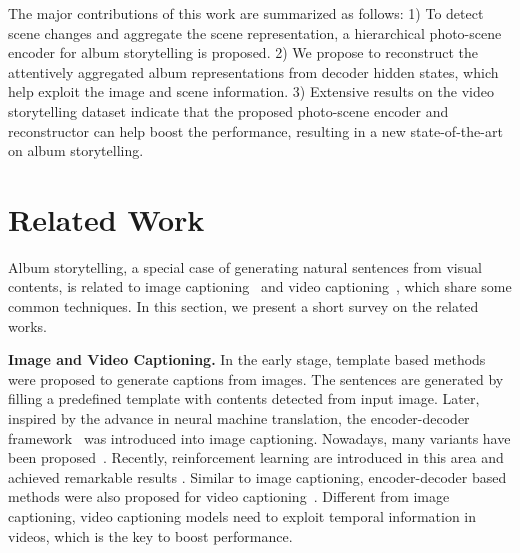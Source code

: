 \documentclass[letterpaper]{article} \usepackage{aaai19}  \usepackage{times}  \usepackage{helvet}  \usepackage{courier}  \usepackage{url}  \usepackage{graphicx}  \usepackage{color}
\begin{document}
The major contributions of this work are summarized as follows:
1) To detect scene changes and aggregate the scene representation, a hierarchical photo-scene encoder for album storytelling is proposed.
2) We propose to reconstruct the attentively aggregated album representations from decoder hidden states, which help exploit the image and scene information. 3) Extensive results on the video storytelling dataset indicate that the proposed photo-scene encoder and reconstructor can help boost the performance, resulting in a new state-of-the-art on album storytelling.


\section{Related Work}

Album storytelling, a special case of generating natural sentences from visual contents, is related to image captioning~\cite{karpathy2014deep,ma2015multimodal,vinyals2015show,chen2018regularizing,jiang2018learning,jiang2018recurrent} and video captioning~\cite{pan2017video,wang2018reconstruction,wang2018bidirectional,chen2018temporally}, which share some common techniques. In this section, we present a short survey on the related works.


\textbf{Image and Video Captioning.} In the early stage, template based methods were proposed to generate captions from images. The sentences are generated by filling a predefined template with contents detected from input image. Later, inspired by the advance in neural machine translation, the encoder-decoder framework~\cite{vinyals2015show} was introduced into image captioning. Nowadays, many variants have been proposed~\cite{xu2015show,he2016dual}.  Recently, reinforcement learning are introduced in this area and achieved remarkable results \cite{rennie2016self,ren2017deep}. Similar to image captioning, encoder-decoder based methods were also proposed for video captioning~\cite{venugopalan2015sequence,pan2016hierarchical}. Different from image captioning, video captioning models need to exploit temporal information in videos, which is the key to boost performance.
\end{document}
